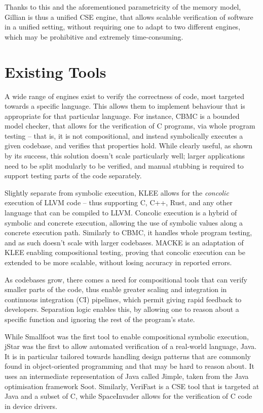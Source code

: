 Thanks to this and the aforementioned parametricity of the memory model, Gillian is thus a unified CSE engine, that allows scalable verification of software in a unified setting, without requiring one to adapt to two different engines, which may be prohibitive and extremely time-consuming.

\section{Existing Tools}

A wide range of engines exist to verify the correctness of code, most targeted towards a specific language. This allows them to implement behaviour that is appropriate for that particular language.
For instance, CBMC \cite{cbmc} is a bounded model checker, that allows for the verification of C programs, via whole program testing -- that is, it is not compositional, and instead symbolically executes a given codebase, and verifies that properties hold. While clearly useful, as shown by its success, this solution doesn't scale particularly well; larger applications need to be split modularly to be verified, and manual stubbing is required to support testing parts of the code separately.

Slightly separate from symbolic execution, KLEE \cite{klee} allows for the \emph{concolic} execution of LLVM code -- thus supporting C, C++, Rust, and any other language that can be compiled to LLVM. Concolic execution is a hybrid of symbolic and concrete execution, allowing the use of symbolic values along a concrete execution path. Similarly to CBMC, it handles whole program testing, and as such doesn't scale with larger codebases. MACKE \cite{macke} is an adaptation of KLEE enabling compositional testing, proving that concolic execution can be extended to be more scalable, without losing accuracy in reported errors.

As codebases grow, there comes a need for compositional tools that can verify smaller parts of the code, thus enable greater scaling and integration in continuous integration (CI) pipelines, which permit giving rapid feedback to developers. Separation logic enables this, by allowing one to reason about a specific function and ignoring the rest of the program's state.

While Smallfoot \cite{smallfoot} was the first tool to enable compositional symbolic execution, jStar \cite{jstar} was the first to allow automated verification of a real-world language, Java. It is in particular tailored towards handling design patterns that are commonly found in object-oriented programming and that may be hard to reason about. It uses an intermediate representation of Java called Jimple, taken from the Java optimisation framework Soot. Similarly, VeriFast \cite{verifast} is a CSE tool that is targeted at Java and a subset of C, while SpaceInvader \cite{spaceinvader} allows for the verification of C code in device drivers.

